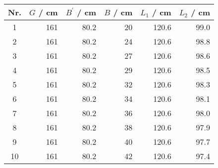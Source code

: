 \begin{tabular}{c|rrrrr}
Nr. & $G$ / cm & $B^\prime$ / cm & $B$ / cm & $L_1$ / cm & $L_2$ / cm \\
\hline
1 & 161 & 80.2 & 20 & 120.6 & 99.0\\
2 & 161 & 80.2 & 24 & 120.6 & 98.8\\
3 & 161 & 80.2 & 27 & 120.6 & 98.6\\
4 & 161 & 80.2 & 29 & 120.6 & 98.5\\
5 & 161 & 80.2 & 32 & 120.6 & 98.3\\
6 & 161 & 80.2 & 34 & 120.6 & 98.1\\
7 & 161 & 80.2 & 36 & 120.6 & 98.0\\
8 & 161 & 80.2 & 38 & 120.6 & 97.9\\
9 & 161 & 80.2 & 40 & 120.6 & 97.7\\
10 & 161 & 80.2 & 42 & 120.6 & 97.4
\end{tabular}
